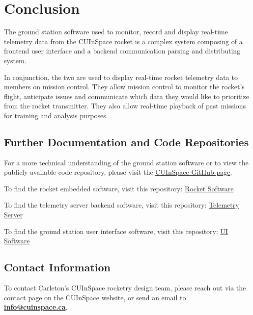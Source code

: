 \sectionfont{\fontsize{14}{14}\selectfont}
\section{Conclusion}

The ground station software used to monitor, record and display real-time telemetry data from the CUInSpace rocket is a
complex system composing of a frontend user interface and a backend communication parsing and distributing system.

In conjunction, the two are used to display real-time rocket telemetry data to members on mission control. They allow
mission control to monitor the rocket's flight, anticipate issues and communicate which data they would like to prioritize from 
the rocket transmitter. They also allow real-time playback of past missions for training and analysis purposes.

\subsection*{Further Documentation and Code Repositories}
For a more technical understanding of the ground station software or to view the publicly available code repository,
please visit the \href{https://github.com/CarletonURocketry}{\underline{CUInSpace GitHub page}}.

To find the rocket embedded software, visit this repository:
\href{https://github.com/CarletonURocketry/avionics-software}{\underline{Rocket Software}}

To find the telemetry server backend software, visit this repository:
\href{https://github.com/CarletonURocketry/ground-station}{\underline{Telemetry Server}}

To find the ground station user interface software, visit this repository:
\href{https://github.com/CarletonURocketry/ground-station-ui}{\underline{UI Software}} 


\subsection*{Contact Information}

To contact Carleton's CUInSpace rocketry design team, please reach out via the \href{https://www.cuinspace.ca/contact-us}
{\underline{contact page}} on the CUInSpace website, or send an email to \href{mailto:info@cuinspace.ca?subject=Question regarding CU InSpace Software}{\textbf{info@cuinspace.ca}}.

